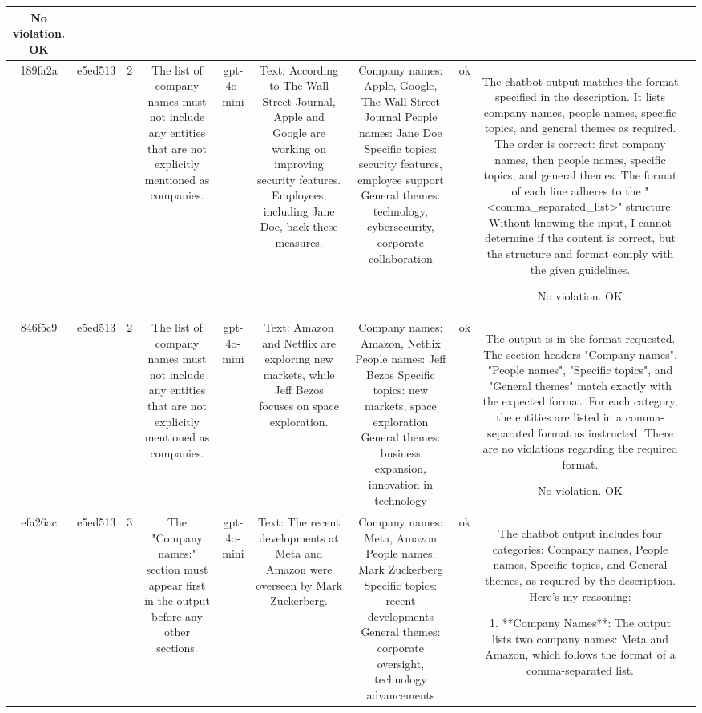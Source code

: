 \begin{table}[h!]
\begin{tabular}{|c|c|c|c|c|c|c|c|c|c|}
No violation.
OK & \\
\hline
189fa2a & e5ed513 & 2 & The list of company names must not include any entities that are not explicitly mentioned as companies. & gpt-4o-mini & Text: According to The Wall Street Journal, Apple and Google are working on improving security features. Employees, including Jane Doe, back these measures. & Company names: Apple, Google, The Wall Street Journal
People names: Jane Doe
Specific topics: security features, employee support
General themes: technology, cybersecurity, corporate collaboration & ok & The chatbot output matches the format specified in the description. It lists company names, people names, specific topics, and general themes as required. The order is correct: first company names, then people names, specific topics, and general themes. The format of each line adheres to the "<comma_separated_list>" structure. Without knowing the input, I cannot determine if the content is correct, but the structure and format comply with the given guidelines.

No violation.
OK & \\
\hline
846f5c9 & e5ed513 & 2 & The list of company names must not include any entities that are not explicitly mentioned as companies. & gpt-4o-mini & Text: Amazon and Netflix are exploring new markets, while Jeff Bezos focuses on space exploration. & Company names: Amazon, Netflix  
People names: Jeff Bezos  
Specific topics: new markets, space exploration  
General themes: business expansion, innovation in technology & ok & The output is in the format requested. The section headers "Company names", "People names", "Specific topics", and "General themes" match exactly with the expected format. For each category, the entities are listed in a comma-separated format as instructed. There are no violations regarding the required format.

No violation.
OK & \\
\hline
efa26ac & e5ed513 & 3 & The "Company names:" section must appear first in the output before any other sections. & gpt-4o-mini & Text: The recent developments at Meta and Amazon were overseen by Mark Zuckerberg. & Company names: Meta, Amazon  
People names: Mark Zuckerberg  
Specific topics: recent developments  
General themes: corporate oversight, technology advancements & ok & The chatbot output includes four categories: Company names, People names, Specific topics, and General themes, as required by the description. Here's my reasoning:

1. **Company Names**: The output lists two company names: Meta and Amazon, which follows the format of a comma-separated list.


\end{tabular}
\end{table}
